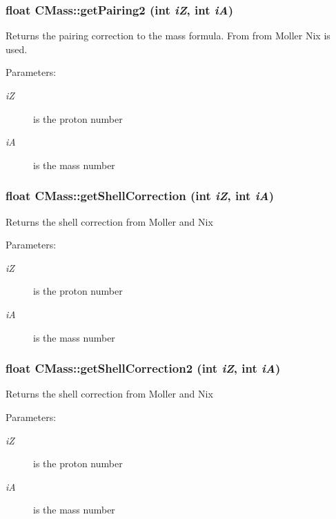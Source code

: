 \subsubsection{\setlength{\rightskip}{0pt plus 5cm}float CMass::get\-Pairing2 (int {\em i\-Z}, int {\em i\-A})}\label{classCMass_b8836a53fe6c21535f969d1c647317d4}


Returns the pairing correction to the mass formula. From from Moller Nix is used. \begin{Desc}
\item[Parameters:]
\begin{description}
\item[{\em i\-Z}]is the proton number \item[{\em i\-A}]is the mass number \end{description}
\end{Desc}
\subsubsection{\setlength{\rightskip}{0pt plus 5cm}float CMass::get\-Shell\-Correction (int {\em i\-Z}, int {\em i\-A})}\label{classCMass_4e81cde4776e71f637ff28cb7b04f20a}


Returns the shell correction from Moller and Nix

\begin{Desc}
\item[Parameters:]
\begin{description}
\item[{\em i\-Z}]is the proton number \item[{\em i\-A}]is the mass number \end{description}
\end{Desc}
\subsubsection{\setlength{\rightskip}{0pt plus 5cm}float CMass::get\-Shell\-Correction2 (int {\em i\-Z}, int {\em i\-A})}\label{classCMass_bb1cecf8c19cba4c047d8376f0ff4895}


Returns the shell correction from Moller and Nix

\begin{Desc}
\item[Parameters:]
\begin{description}
\item[{\em i\-Z}]is the proton number \item[{\em i\-A}]is the mass number \end{description}
\end{Desc}
